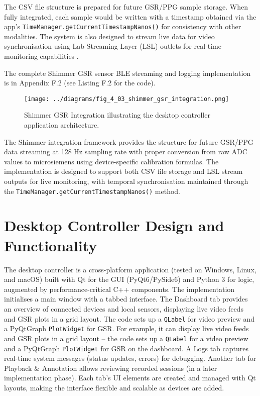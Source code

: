 The CSV file structure is prepared for future GSR/PPG sample storage. When fully integrated, each sample would be written with a timestamp obtained via the app's \texttt{TimeManager.getCurrentTimestampNanos()} for consistency with other modalities. The system is also designed to stream live data for video synchronisation using Lab Streaming Layer (LSL) outlets for real-time monitoring capabilities \cite{ref9}.

The complete Shimmer GSR sensor BLE streaming and logging implementation is in Appendix F.2 (see Listing F.2 for the code).

\begin{figure}[htbp]
    \centring
    \texttt{[image: ../diagrams/fig\_4\_03\_shimmer\_gsr\_integration.png]}
    \caption{Shimmer GSR Integration illustrating the desktop controller application architecture.}
    \label{fig:4_03_shimmer_gsr_integration}
\end{figure}

The Shimmer integration framework provides the structure for future GSR/PPG data streaming at 128 Hz sampling rate with proper conversion from raw ADC values to microsiemens using device-specific calibration formulas. The implementation is designed to support both CSV file storage and LSL stream outputs for live monitoring, with temporal synchronisation maintained through the \texttt{TimeManager.getCurrentTimestampNanos()} method.


\section{Desktop Controller Design and Functionality}\label{sec:4-3}
The desktop controller is a cross-platform application (tested on Windows, Linux, and macOS) built with Qt for the GUI (PyQt6/PySide6) \cite{ref17} and Python 3 for logic, augmented by performance-critical C++ components. The implementation initialises a main window with a tabbed interface. The Dashboard tab provides an overview of connected devices and local sensors, displaying live video feeds and GSR plots in a grid layout. The code sets up a \texttt{QLabel} for video preview and a PyQtGraph \texttt{PlotWidget} for GSR. For example, it can display live video feeds and GSR plots in a grid layout -- the code sets up a \texttt{QLabel} for a video preview and a PyQtGraph \texttt{PlotWidget} for GSR on the dashboard. A Logs tab captures real-time system messages (status updates, errors) for debugging. Another tab for Playback \& Annotation allows reviewing recorded sessions (in a later implementation phase). Each tab's UI elements are created and managed with Qt layouts, making the interface flexible and scalable as devices are added.

